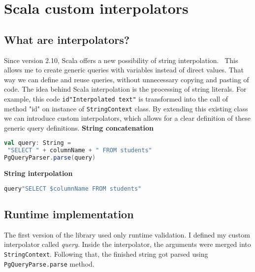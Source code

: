 \section{Scala custom interpolators}
\subsection{What are interpolators?}
Since version 2.10, Scala offers a new possibility of string interpolation.~\cite{String interpolation} This allows me to create generic queries with variables instead of direct values. That way we can define and reuse queries, without unnecessary copying and pasting of code. The idea behind Scala interpolation is the processing of string literals. For example, this code  \verb|id"Interpolated text"| is transformed into the call of method "id" on instance of \texttt{StringContext} class. By extending this existing class we can introduce custom interpolators, which allows for a clear definition of these generic query definitions.
\bigskip
\newline
\textbf{String concatenation}
\begin{lstlisting}[language=scala, basicstyle=\ttfamily, showstringspaces=false]
val query: String = 
 "SELECT " + columnName + " FROM students"
PgQueryParser.parse(query)
\end{lstlisting}
\bigskip
\textbf{String interpolation}
\begin{lstlisting}[language=scala, basicstyle=\ttfamily, showstringspaces=false]
query"SELECT $columnName FROM students"
\end{lstlisting}

\subsection{Runtime implementation}
The first version of the library used only runtime validation. I defined my custom interpolator called \textit{query}. Inside the interpolator, the arguments were merged into \texttt{StringContext}. Following that, the finished string got parsed using \texttt{PgQueryParse.parse} method.
